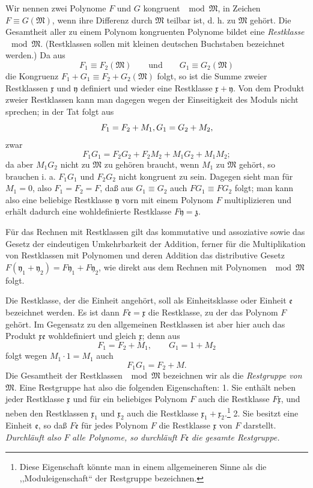 \documentclass[11pt]{article}
\newcommand{\mM}{\mathfrak{M}}
\newcommand{\mx}{\mathfrak{x}}
\newcommand{\my}{\mathfrak{y}}
\newcommand{\mz}{\mathfrak{z}}
\newcommand{\me}{\mathfrak{e}}
\begin{document}
Wir nennen zwei Polynome $F$ und $G$ kongruent $\mod\mM$, in Zeichen $F\equiv G(\mM)$, wenn ihre Differenz durch $\mM$ teilbar ist, d. h. zu $\mM$ gehört. Die Gesamtheit aller zu einem Polynom kongruenten Polynome bildet eine \emph{Restklasse} $\mod\mM$. (Restklassen sollen mit kleinen deutschen Buchstaben bezeichnet werden.) Da aus
\[
 F_1\equiv F_2(\mM)\qquad\text{und}\qquad G_1\equiv G_2(\mM)
\]
die Kongruenz $F_1+G_1\equiv F_2+G_2(\mM)$ folgt, so ist die Summe zweier Restklassen $\mx$ und $\my$ definiert und wieder eine Restklasse $\mx+\my$. Von dem Produkt zweier Restklassen kann man dagegen wegen der Einseitigkeit des Moduls nicht sprechen; in der Tat folgt aus
\[
 F_1=F_2+M_1,\\ G_1=G_2+M_2,
\]
zwar
\[
 F_1G_1=F_2G_2+F_2M_2+M_1G_2+M_1M_2;
\]
da aber $M_1G_2$ nicht zu $\mM$ zu gehören braucht, wenn $M_1$ zu $\mM$ gehört, so brauchen i. a. $F_1G_1$ und $F_2G_2$ nicht kongruent zu sein. Dagegen sieht man für $M_1=0$, also $F_1=F_2=F$, daß aus $G_1\equiv G_2$ auch $FG_1\equiv FG_2$ folgt; man kann also eine beliebige Restklasse $\my$ vorn mit einem Polynom $F$ multiplizieren und erhält dadurch eine wohldefinierte Restklasse $F\my=\mz$.

Für das Rechnen mit Restklassen gilt das kommutative und assoziative sowie das Gesetz der eindeutigen Umkehrbarkeit der Addition, ferner für die Multiplikation von Restklassen mit Polynomen und deren Addition das distributive Gesetz $F(\my_1+\my_2)=F\my_1+F\my_2$, wie direkt aus dem Rechnen mit Polynomen $\mod\mM$ folgt.

Die Restklasse, der die Einheit angehört, soll als Einheitsklasse oder Einheit $\me$ bezeichnet werden. Es ist dann $F\me=\mx$ die Restklasse, zu der das Polynom $F$ gehört. Im Gegensatz zu den allgemeinen Restklassen ist aber hier auch das Produkt $\mx\me$ wohldefiniert und gleich $\mx$; denn aus
\[
 F_1=F_2+M_1,\qquad G_1=1+M_2
\]
folgt wegen $M_1\cdot1=M_1$ auch
\[
 F_1G_1=F_2+M.
\]
Die Gesamtheit der Restklassen $\mod\mM$ bezeichnen wir als die \emph{Restgruppe von} $\mM$. Eine Restgruppe hat also die folgenden Eigenschaften: 1. Sie enthält neben jeder Restklasse $\mx$ und für ein beliebiges Polynom $F$ auch die Restklasse $F\mx$, und neben den Restklassen $\mx_1$ und $\mx_2$ auch die Restklasse $\mx_1+\mx_2$.\footnote{Diese Eigenschaft könnte man in einem allgemeineren Sinne als die ,,Moduleigenschaft`` der Restgruppe bezeichnen.} 2. Sie besitzt eine Einheit $\me$, so daß $F\me$ für jedes Polynom $F$ die Restklasse $\mx$ von $F$ darstellt. \emph{Durchläuft also} $F$ \emph{alle Polynome, so durchläuft} $F\me$ \emph{die gesamte Restgruppe.}
\end{document}
